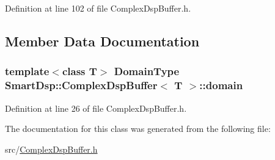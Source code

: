 Definition at line 102 of file Complex\+Dsp\+Buffer.\+h.



\subsection{Member Data Documentation}
\hypertarget{class_smart_dsp_1_1_complex_dsp_buffer_ab4954544b54bb7bd220c66f979d294b2}{
\subsubsection[{domain}]{\setlength{\rightskip}{0pt plus 5cm}template$<$class T$>$ {\bf Domain\+Type} {\bf Smart\+Dsp\+::\+Complex\+Dsp\+Buffer}$<$ T $>$\+::domain}}\label{class_smart_dsp_1_1_complex_dsp_buffer_ab4954544b54bb7bd220c66f979d294b2}


Definition at line 26 of file Complex\+Dsp\+Buffer.\+h.



The documentation for this class was generated from the following file\+:\begin{DoxyCompactItemize}
\item 
src/\hyperlink{_complex_dsp_buffer_8h}{Complex\+Dsp\+Buffer.\+h}\end{DoxyCompactItemize}
